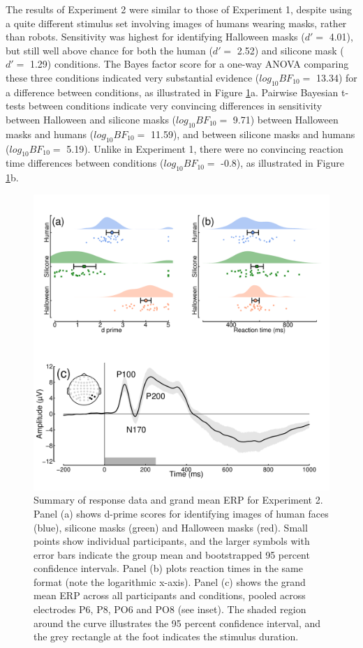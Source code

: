\documentclass[
]{article}
\begin{document}
The results of Experiment 2 were similar to those of Experiment 1, despite using a quite different stimulus set involving images of humans wearing masks, rather than robots. Sensitivity was highest for identifying Halloween masks (\(d' =\) 4.01), but still well above chance for both the human (\(d' =\) 2.52) and silicone mask (\(d' =\) 1.29) conditions. The Bayes factor score for a one-way ANOVA comparing these three conditions indicated very substantial evidence (\(log_{10}BF_{10} =\) 13.34) for a difference between conditions, as illustrated in Figure \ref{fig:MasksData}a. Pairwise Bayesian t-tests between conditions indicate very convincing differences in sensitivity between Halloween and silicone masks (\(log_{10}BF_{10} =\) 9.71) between Halloween masks and humans (\(log_{10}BF_{10} =\) 11.59), and between silicone masks and humans (\(log_{10}BF_{10} =\) 5.19). Unlike in Experiment 1, there were no convincing reaction time differences between conditions (\(log_{10}BF_{10} =\) -0.8), as illustrated in Figure \ref{fig:MasksData}b.

\begin{figure}

{\centering \includegraphics{Figures/MasksData} 

}

\caption{Summary of response data and grand mean ERP for Experiment 2. Panel (a) shows d-prime scores for identifying images of human faces (blue), silicone masks (green) and Halloween masks (red). Small points show individual participants, and the larger symbols with error bars indicate the group mean and bootstrapped 95 percent confidence intervals. Panel (b) plots reaction times in the same format (note the logarithmic x-axis). Panel (c) shows the grand mean ERP across all participants and conditions, pooled across electrodes P6, P8, PO6 and PO8 (see inset). The shaded region around the curve illustrates the 95 percent confidence interval, and the grey rectangle at the foot indicates the stimulus duration.}\label{fig:MasksData}
\end{figure}
\end{document}

